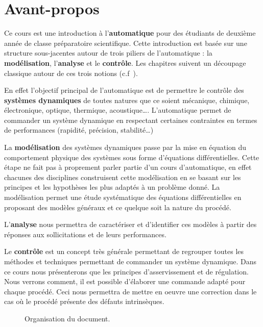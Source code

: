 \chapter*{Avant-propos}

Ce cours est une introduction à l'\textbf{automatique}
pour des étudiants de deuxième année de classe préparatoire scientifique.
Cette introduction est basée sur une structure sous-jacentes autour de 
trois piliers de l'automatique : la \textbf{modélisation}, l'\textbf{analyse} et 
le \textbf{contrôle}. Les chapitres suivent un découpage classique
autour de ces trois notions (c.f~).

En effet l'objectif principal de l'automatique est de permettre
le contrôle des \textbf{systèmes dynamiques}
de toutes natures que ce soient mécanique, chimique, 
électronique, optique, thermique, acoustique\ldots.
L'automatique permet de commander un système dynamique en respectant
certaines contraintes en termes de performances (rapidité, précision, stabilité\ldots)

La \textbf{modélisation} des systèmes dynamiques passe par 
la mise en équation du comportement physique des
systèmes sous forme d'équations différentielles.
Cette étape ne fait pas à proprement parler partie d'un cours d'automatique,
en effet chacunes des disciplines construisent cette modélisation 
en se basant sur les principes et les hypothèses les plus adaptés 
à un problème donné.
La modélisation permet une étude systématique des équations
différentielles en proposant des modèles généraux 
et ce quelque soit la nature du procédé.

L'\textbf{analyse} nous permettra de caractériser et d'identifier 
ces modèles à partir des réponses aux sollicitations et de leurs performances.

Le \textbf{contrôle} est un concept très générale permettant de regrouper
toutes les méthodes et techniques permettant de commander un système dynamique.
Dans ce cours nous présenterons que les principes d'asservissement et de régulation.
Nous verrons comment, il est possible d'élaborer une commande adapté pour chaque
procédé. Ceci nous permettra de mettre en oeuvre
une correction dans le cas où le procédé présente des défauts intrinsèques.


\begin{figure}[!h]
\renewcommand\thefigure{A}
\begin{center}
{
\tikzset{external/export=false}

}
\end{center}
\caption{Organisation du document.\label{fig-diagramme_cours}}
\end{figure}
